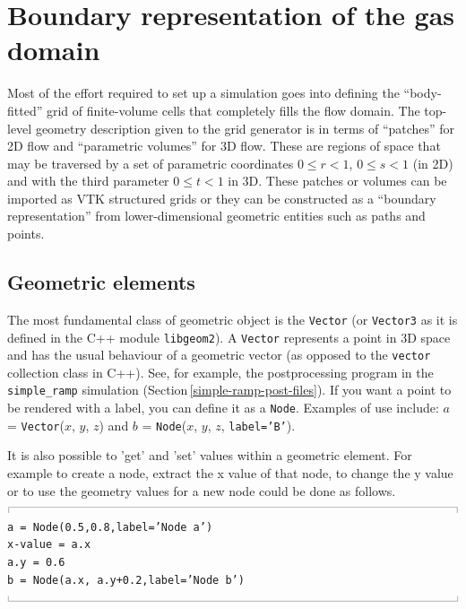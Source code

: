 \documentclass[12pt,a4paper,twoside]{article}
\newcommand{\topbar}{\ensuremath{
    \rule{0.1mm}{2.0mm} \rule[2.0mm]{159.5mm}{0.1mm} \rule{0.1mm}{2.0mm}
}}
\newcommand{\bottombar}{\ensuremath{
    \rule{0.1mm}{2.0mm} \rule{159.5mm}{0.1mm} \rule{0.1mm}{2.0mm}
}}
\begin{document}
\section{Boundary representation of the gas domain}
%
Most of the effort required to set up a simulation goes into defining the
``body-fitted'' grid of finite-volume cells that completely fills the flow
domain.
The top-level geometry description given to the grid generator is in terms of
``patches'' for 2D flow and ``parametric volumes'' for 3D flow.
These are regions of space that may be traversed by
a set of parametric coordinates $0 \le r < 1$, $0 \le s < 1$ (in 2D) and 
with the third parameter $0 \le t < 1$ in 3D.
These patches or volumes can be imported as VTK structured grids or they can be
constructed as a ``boundary representation'' from lower-dimensional 
geometric entities such as paths and points.

\subsection{Geometric elements}
%
The most fundamental class of geometric object is the \texttt{Vector} (or
\texttt{Vector3} as it is defined in the C++ module \texttt{libgeom2}).
A \texttt{Vector} represents a point in 3D space and has the usual behaviour 
of a geometric vector (as opposed to the \texttt{vector} collection class in
C++).
See, for example, the postprocessing program in the \texttt{simple\_ramp}
simulation (Section\,\ref{simple-ramp-post-files}).
If you want a point to be rendered with a label, you can define it as a
\texttt{Node}.
Examples of use include: $a$ = \texttt{Vector}($x$, $y$, $z$) and
$b$ = \texttt{Node}($x$, $y$, $z$, \texttt{label='B'}).

\medskip
It is also possible to 'get' and 'set' values within a geometric element. For example to
create a node, extract the x value of that node, to change the y value or to use
the geometry values for a new node could be done as follows.\\
\topbar\\
\texttt{a = Node(0.5,0.8,label='Node a')}\\
\texttt{x-value = a.x}\\
\texttt{a.y = 0.6}\\
\texttt{b = Node(a.x, a.y+0.2,label='Node b')}\\
\bottombar\\
\end{document}
